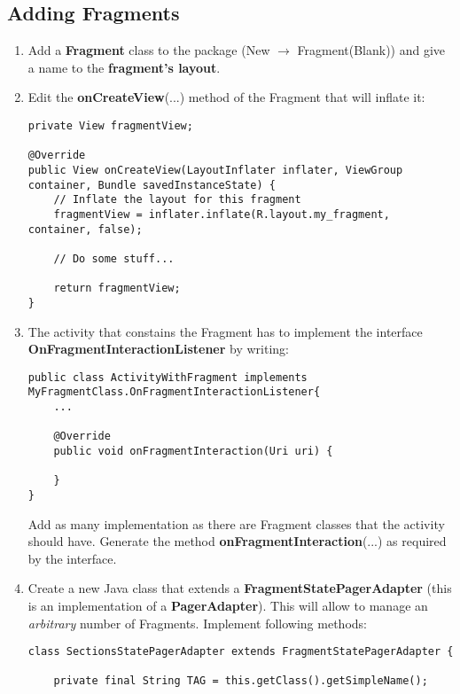 \documentclass[11pt]{article}
\begin{document}
\subsection{Adding Fragments}
\begin{enumerate}
    \item Add a \textbf{Fragment} class to the package (New $\rightarrow$ Fragment(Blank)) and give a name to the \textbf{fragment's layout}.
    
    \item Edit the \textbf{onCreateView}(...) method of the Fragment that will inflate it: 
    \lstset{language = Java}
    \begin{lstlisting}
private View fragmentView;

@Override
public View onCreateView(LayoutInflater inflater, ViewGroup container, Bundle savedInstanceState) {
    // Inflate the layout for this fragment
    fragmentView = inflater.inflate(R.layout.my_fragment, container, false);
    
    // Do some stuff...
    
    return fragmentView;
}
    \end{lstlisting}
    
    \item The activity that constains the Fragment has to implement the interface \textbf{OnFragmentInteractionListener} by writing:
    \lstset{language = Java}
    \begin{lstlisting}
public class ActivityWithFragment implements MyFragmentClass.OnFragmentInteractionListener{
    ...
    
    @Override
    public void onFragmentInteraction(Uri uri) {

    }
}
    \end{lstlisting}
    Add as many implementation as there are Fragment classes that the activity should have. Generate the method \textbf{onFragmentInteraction}(...) as required by the interface. 
    
    \item Create a new Java class that extends a \textbf{FragmentStatePagerAdapter} (this is an implementation of a \textbf{PagerAdapter}). This will allow to manage an \emph{arbitrary} number of Fragments. Implement following methods:
    \lstset{language = Java}
    \begin{lstlisting}
class SectionsStatePagerAdapter extends FragmentStatePagerAdapter {

    private final String TAG = this.getClass().getSimpleName();


\end{lstlisting}
\end{enumerate}
\end{document}
